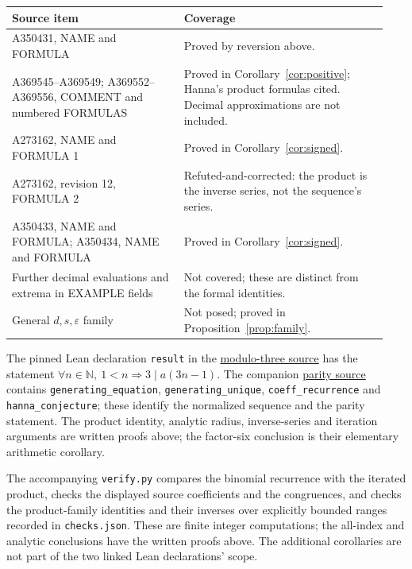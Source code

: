 \documentclass[11pt]{article}
\begin{document}
\begin{center}
\small
\begin{tabular}{@{}p{0.43\linewidth}p{0.51\linewidth}@{}}
\toprule
Source item & Coverage \\
\midrule
A350431, NAME and FORMULA & Proved by reversion above. \\
A369545--A369549; A369552--A369556, COMMENT and numbered FORMULAS
& Proved in Corollary~\ref{cor:positive}; Hanna's product formulas cited.
Decimal approximations are not included. \\
A273162, NAME and FORMULA 1 & Proved in Corollary~\ref{cor:signed}. \\
A273162, revision 12, FORMULA 2 & Refuted-and-corrected:
the product is the inverse series, not the sequence's series. \\
A350433, NAME and FORMULA; A350434, NAME and FORMULA
& Proved in Corollary~\ref{cor:signed}. \\
Further decimal evaluations and extrema in EXAMPLE fields
& Not covered; these are distinct from the formal identities. \\
General $d,s,\varepsilon$ family & Not posed; proved in
Proposition~\ref{prop:family}. \\
\bottomrule
\end{tabular}
\end{center}

The pinned Lean declaration \texttt{result} in the
\href{https://github.com/the-omega-institute/trureturing/blob/074df09ddbbef1843ddb383577bfaa827f753e36/D5/S1/Recurrence/Parity/SquareCubeSubstitutionThreeIndexModThree.lean}{modulo-three source}
has the statement $\forall n\in\mathbb N,\ 1<n\Rightarrow3\mid a(3n-1)$.
The companion
\href{https://github.com/the-omega-institute/trureturing/blob/074df09ddbbef1843ddb383577bfaa827f753e36/D5/S1/Recurrence/Parity/SquareCubeSubstitutionOddIndexParity.lean}{parity source}
contains \texttt{generating\_equation}, \texttt{generating\_unique},
\texttt{coeff\_recurrence} and \texttt{hanna\_conjecture}; these identify the
normalized sequence and the parity statement. The product identity, analytic
radius, inverse-series and iteration arguments are written proofs above;
the factor-six conclusion is their elementary arithmetic corollary.

The accompanying \texttt{verify.py} compares the binomial recurrence with
the iterated product, checks the displayed source coefficients and the
congruences, and checks the product-family identities and their inverses
over explicitly bounded ranges recorded in \texttt{checks.json}.
These are finite integer computations; the all-index and analytic conclusions
have the written proofs above. The additional corollaries are not part of
the two linked Lean declarations' scope.
\end{document}
